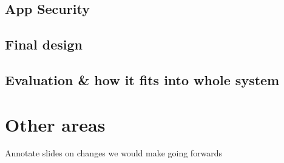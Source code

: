 \documentclass{article}
\begin{document}
\subsection{App Security}\label{ssec:app-security}

\subsection{Final design}\label{ssec:app-final-design}

\subsection{Evaluation \& how it fits into whole system}\label{ssec:app-evaluation}

\section{Other areas}\label{sec:other}
Annotate slides on changes we would make going forwards








\end{document}
